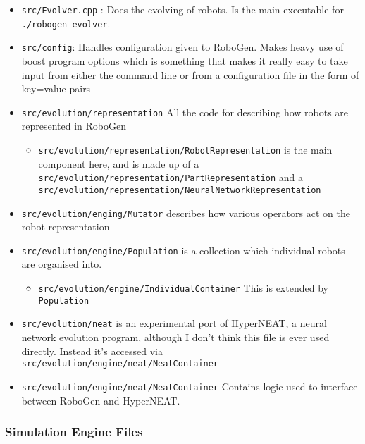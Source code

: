 \begin{itemize}
\item
  \texttt{src/Evolver.cpp} : Does the evolving of robots. Is the main
  executable for \texttt{./robogen-evolver}.
\item
  \texttt{src/config}: Handles configuration given to RoboGen. Makes
  heavy use of
  \href{https://www.boost.org/doc/libs/1_77_0/doc/html/program_options/tutorial.html}{boost
  program options} which is something that makes it really easy to take
  input from either the command line or from a configuration file in the
  form of key=value pairs
\item
  \texttt{src/evolution/representation} All the code for describing how
  robots are represented in RoboGen

  \begin{itemize}
  \item
    \texttt{src/evolution/representation/RobotRepresentation} is the
    main component here, and is made up of a
    \texttt{src/evolution/representation/PartRepresentation} and a
    \texttt{src/evolution/representation/NeuralNetworkRepresentation}
  \end{itemize}
\item
  \texttt{src/evolution/enging/Mutator} describes how various operators
  act on the robot representation
\item
  \texttt{src/evolution/engine/Population} is a collection which
  individual robots are organised into.

  \begin{itemize}
  \item
    \texttt{src/evolution/engine/IndividualContainer} This is extended
    by \texttt{Population}
  \end{itemize}
\item
  \texttt{src/evolution/neat} is an experimental port of
  \href{https://github.com/peter-ch/MultiNEAT}{HyperNEAT}, a neural
  network evolution program, although I don't think this file is ever
  used directly. Instead it's accessed via
  \texttt{src/evolution/engine/neat/NeatContainer}
\item
  \texttt{src/evolution/engine/neat/NeatContainer} Contains logic used
  to interface between RoboGen and HyperNEAT.
\end{itemize}

\hypertarget{simulation-engine-files}{%
\subsubsection{Simulation Engine Files}\label{simulation-engine-files}}

